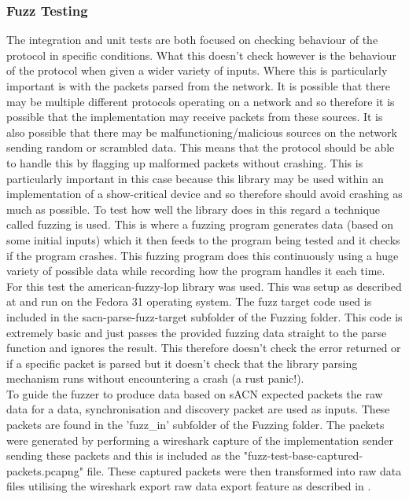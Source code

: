 \documentclass[11pt,a4paper]{article}
\begin{document}
\subsubsection{Fuzz Testing}
The integration and unit tests are both focused on checking behaviour of the protocol in specific conditions. What this doesn't check however is the behaviour of the protocol when given a wider variety of inputs. Where this is particularly important is with the packets parsed from the network. It is possible that there may be multiple different protocols operating on a network and so therefore it is possible that the implementation may receive packets from these sources. It is also possible that there may be malfunctioning/malicious sources on the network sending random or scrambled data. This means that the protocol should be able to handle this by flagging up malformed packets without crashing. This is particularly important in this case because this library may be used within an implementation of a show-critical device and so therefore should avoid crashing as much as possible. To test how well the library does in this regard a technique called fuzzing is used. This is where a fuzzing program generates data (based on some initial inputs) which it then feeds to the program being tested and it checks if the program crashes. This fuzzing program does this continuously using a huge variety of possible data while recording how the program handles it each time.\\

For this test the american-fuzzy-lop library \cite{RUST_AFL_FUZZ} was used. This was setup as described at \cite{RUST_AFL_FUZZ_DOC} and run on the Fedora 31 operating system. The fuzz target code used is included in the sacn-parse-fuzz-target subfolder of the Fuzzing folder. This code is extremely basic and just passes the provided fuzzing data straight to the parse function and ignores the result. This therefore doesn't check the error returned or if a specific packet is parsed but it doesn't check that the library parsing mechanism runs without encountering a crash (a rust panic!).\\

To guide the fuzzer to produce data based on sACN expected packets the raw data for a data, synchronisation and discovery packet are used as inputs. These packets are found in the 'fuzz\_in' subfolder of the Fuzzing folder. The packets were generated by performing a wireshark capture of the implementation sender sending these packets and this is included as the "fuzz-test-base-captured-packets.pcapng" file. These captured packets were then transformed into raw data files utilising the wireshark export raw data export feature as described in \cite{WIRESHARK_EXPORT_RAW}.\\
\end{document}
